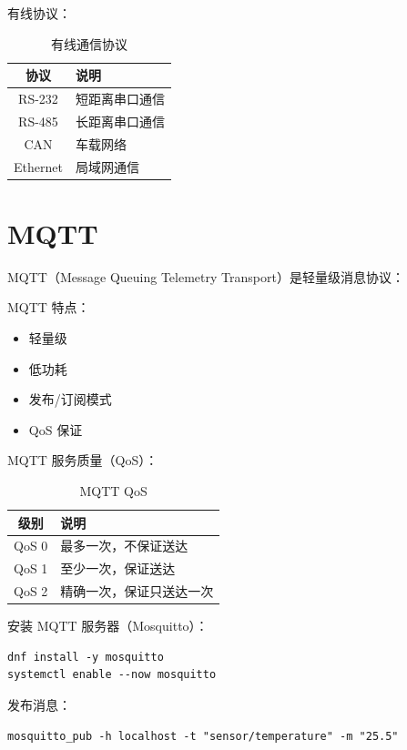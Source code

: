 \documentclass[12pt,UTF8]{ctexbook}
\begin{document}
有线协议：
\begin{table}[htbp]
    \centering
    \caption{有线通信协议}
    \begin{tabular}{|c|p{8cm}|}
        \hline
        \textbf{协议} & \textbf{说明} \\
        \hline
        RS-232 & 短距离串口通信 \\
        \hline
        RS-485 & 长距离串口通信 \\
        \hline
        CAN & 车载网络 \\
        \hline
        Ethernet & 局域网通信 \\
        \hline
    \end{tabular}
\end{table}

\section{MQTT}
\label{sec:mqtt}

MQTT（Message Queuing Telemetry Transport）是轻量级消息协议：

MQTT 特点：
\begin{itemize}
    \item 轻量级
    \item 低功耗
    \item 发布/订阅模式
    \item QoS 保证
\end{itemize}

MQTT 服务质量（QoS）：
\begin{table}[htbp]
    \centering
    \caption{MQTT QoS}
    \begin{tabular}{|c|p{8cm}|}
        \hline
        \textbf{级别} & \textbf{说明} \\
        \hline
        QoS 0 & 最多一次，不保证送达 \\
        \hline
        QoS 1 & 至少一次，保证送达 \\
        \hline
        QoS 2 & 精确一次，保证只送达一次 \\
        \hline
    \end{tabular}
\end{table}

安装 MQTT 服务器（Mosquitto）：
\begin{verbatim}
dnf install -y mosquitto
systemctl enable --now mosquitto
\end{verbatim}

发布消息：
\begin{verbatim}
mosquitto_pub -h localhost -t "sensor/temperature" -m "25.5"
\end{verbatim}
\end{document}

